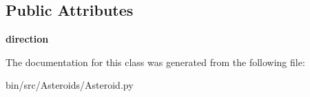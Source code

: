 \subsection*{Public Attributes}
\begin{DoxyCompactItemize}
\item 
{\bfseries direction}\hypertarget{classAsteroid_1_1Asteroid_a0a8ab6e30ef6f80384878b4eb4e60d25}{}\label{classAsteroid_1_1Asteroid_a0a8ab6e30ef6f80384878b4eb4e60d25}

\end{DoxyCompactItemize}


The documentation for this class was generated from the following file\+:\begin{DoxyCompactItemize}
\item 
bin/src/\+Asteroids/Asteroid.\+py\end{DoxyCompactItemize}
